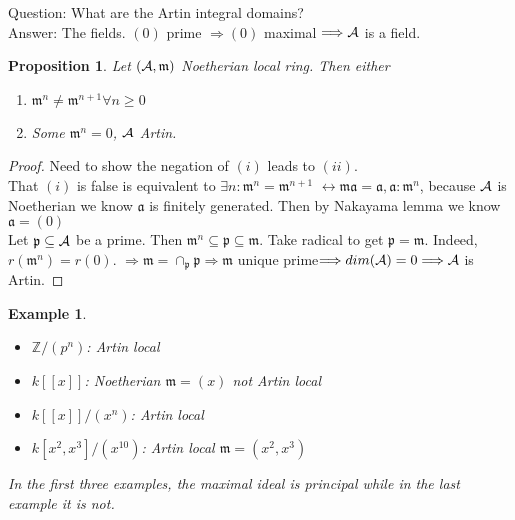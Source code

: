 \documentclass[11pt]{article}
\newtheorem{prop}[thm]{Proposition}
\newtheorem{ex}[thm]{Example}
\newcommand{\intg}{\mathbb Z}
\newcommand{\sca}{{\mathfrak a}}
\newcommand{\scm}{{\mathfrak m}}
\newcommand{\scp}{{\mathfrak p}}
\newcommand{\cala}{{\cal A}}
\newcommand{\Lrta}{\Longrightarrow}
\newcommand{\llrta}{\longleftrightarrow}
\begin{document}
Question: What are the Artin integral domains?\\
Answer: The fields. $(0)$ prime $\Lrta (0)$ maximal $\Lrta \cala$ is a field. 

\begin{prop}
Let $(\cala,\scm)$ Noetherian local ring. Then either 
\begin{enumerate}[label=(\roman*)]
\item $\scm^n\neq \scm^{n+1}\forall n\geq 0$
\item Some $\scm^n=0$, $\cala$ Artin.
\end{enumerate}
\end{prop}
\begin{proof}
Need to show the negation of $(i)$ leads to $(ii)$.\\
That $(i)$ is false is equivalent to $\exists n:\scm^n=\scm^{n+1}$ $\llrta \scm\sca=\sca,\sca:\scm^n$, because $\cala$ is Noetherian we know $\sca$ is finitely generated. Then by Nakayama lemma we know $\sca=(0)$\\

Let $\scp\subseteq \cala$ be a prime. Then $\scm^n\subseteq \scp\subseteq \scm$. Take radical to get $\scp=\scm$. Indeed, $r(\scm^n)=r(0).$ $\Lrta \scm=\cap_\scp\scp\Lrta \scm $ unique prime$\Lrta dim(\cala)=0\Lrta \cala$ is Artin.
\end{proof}

\begin{ex}\ 
\begin{itemize}
\item $\intg/(p^n)$: Artin local
\item $k[[x]]$: Noetherian $\scm=(x)$ not Artin local
\item $k[[x]]/(x^n)$: Artin local
\item $k[x^2,x^3]/(x^{10})$: Artin local $\scm=(x^2,x^3)$
\end{itemize}
In the first three examples, the maximal ideal is principal while in the last example it is not.
\end{ex}
\end{document}
